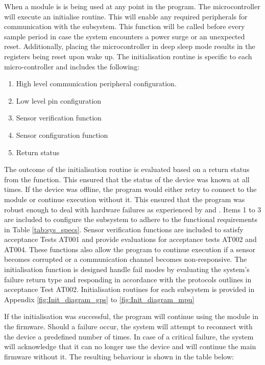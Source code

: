 When a module is is being used at any point in the program. The microcontroller will execute an initialise routine. This will enable any required peripherals for communication with the subsystem. This function will be called before every sample period in case the system encounters a power surge or an unexpected reset. Additionally, placing the microcontroller in deep sleep mode results in the registers being reset upon wake up. The initialisation routine is specific to each micro-controller and includes the following:

\begin{enumerate}
	\item High level communication peripheral configuration.
	\item Low level pin configuration
	\item Sensor verification function
	\item Sensor configuration function
	\item Return status
\end{enumerate}

The outcome of the initialisation routine is evaluated based on a return status from the function. This ensured that the status of the device was known at all times. If the device was offline, the program would either retry to connect to the module or continue execution without it. This ensured that the program was robust enough to deal with hardware failures as experienced by \textcite{doble2017robust} and \textcite{rabault2018investigation}. Items 1 to 3 are included to configure the subsystem to adhere to the functional requirements in Table \ref{tab:sys_specs}. Sensor verification functions are included to satisfy acceptance Tests AT001 and provide evaluations for acceptance tests AT002 and AT004. These functions also allow the program to continue execution if a sensor becomes corrupted or a communication channel becomes non-responsive. The initialisation function is designed handle fail modes by evaluating the system's failure return type and responding in accordance with the protocols outlines in acceptance Test AT002. Initialisation routines for each subsystem is provided in Appendix \ref{fig:Init_diagram_gps} to \ref{fig:Init_diagram_mpu}

If the initialisation was successful, the program will continue using the module in the firmware. Should a failure occur, the system will attempt to reconnect with the device a predefined number of times. In case of a critical failure, the system will acknowledge that it can no longer use the device and will continue the main firmware without it. The resulting behaviour is shown in the table below:

